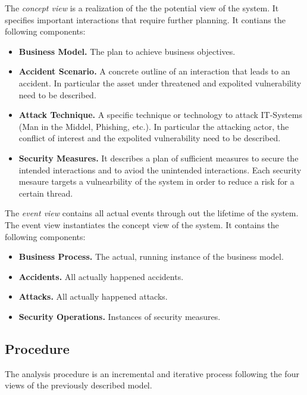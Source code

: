 The \emph{concept view} is a realization of the the potential view of the system.
It specifies important interactions that require further planning.
It contians the following components:
\begin{itemize}
\item \textbf{Business Model.}
The plan to achieve business objectives.

\item \textbf{Accident Scenario.}
A concrete outline of an interaction that leads to an accident.
In particular the asset under threatened and expolited vulnerability need to be described.

\item \textbf{Attack Technique.}
A specific technique or technology to attack IT-Systems (Man in the Middel, Phishing, etc.).
In particular the attacking actor, the conflict of interest and the expolited vulnerability need to be described.

\item \textbf{Security Measures.}
It describes a plan of sufficient measures to secure the intended interactions and to aviod the unintended interactions.
Each security mesaure targets a vulnearbility of the system in order to reduce a risk for a certain thread.
\end{itemize}




The \emph{event view} contains all actual events through out the lifetime of the system.
The event view instantiates the concept view of the system.
It contains the following components:
\begin{itemize}
\item \textbf{Business Process.}
The actual, running instance of the business model.

\item \textbf{Accidents.}
All actually happened accidents.

\item \textbf{Attacks.}
All actually happened attacks.

\item \textbf{Security Operations.}
Instances of security measures.
\end{itemize}




\subsection{Procedure}

The analysis procedure is an incremental and iterative process following the four views of the previously described model.

